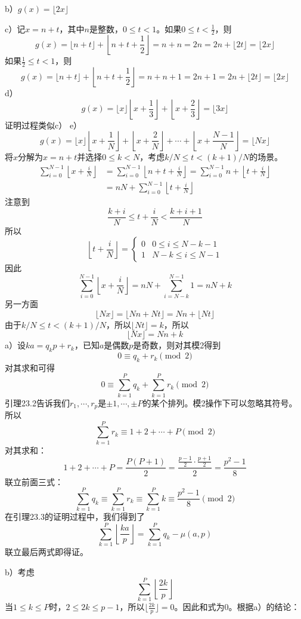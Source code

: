 b）$g(x)=\lfloor 2x\rfloor$\par
c）\proof 记$x=n+t$，其中$n$是整数，$0\le t<1$。如果$0\le t<\frac{1}{2}$，则
\[g(x)=\lfloor n+t\rfloor+\left\lfloor n+t+\frac{1}{2}\right\rfloor=n+n=2n=2n+\lfloor2t\rfloor=\lfloor 2x\rfloor\]
如果$\frac{1}{2}\le t<1$，则
\[g(x)=\lfloor n+t\rfloor+\left\lfloor n+t+\frac{1}{2}\right\rfloor=n+n+1=2n+1=2n+\lfloor2t\rfloor=\lfloor 2x\rfloor\]
d）
\[g(x)=\lfloor x\rfloor\left\lfloor x+\frac{1}{3}\right\rfloor+\left\lfloor x+\frac{2}{3}\right\rfloor=\lfloor3x\rfloor\]
证明过程类似c）
e）\[g(x)=\lfloor x\rfloor\left\lfloor x+\frac{1}{N}\right\rfloor+\left\lfloor x+\frac{2}{N}\right\rfloor+\cdots + \left\lfloor x+\frac{N-1}{N}\right\rfloor=\lfloor Nx\rfloor\]
\proof 将$x$分解为$x=n+t$并选择$0\le k<N$，考虑$k/N\le t<(k+1)/N$的场景。
\begin{align*}
\sum_{i=0}^{N-1}\left\lfloor x+\frac{i}{N}\right\rfloor&=\sum_{i=0}^{N-1}\left\lfloor n+t+\frac{i}{N}\right\rfloor=\sum_{i=0}^{N-1}n+\left\lfloor t+\frac{i}{N}\right\rfloor \\
&=nN + \sum_{i=0}^{N-1}\left\lfloor t+\frac{i}{N}\right\rfloor
\end{align*}
注意到
\[\frac{k+i}{N}\le t+\frac{i}{N}<\frac{k+i+1}{N}\]
所以
\[\left\lfloor t+\frac{i}{N}\right\rfloor=
\begin{cases}
0 & 0\le i \le N-k-1 \\
1 & N-k\le i \le N-1
\end{cases}\]
因此
\[\sum_{i=0}^{N-1}\left\lfloor x+\frac{i}{N}\right\rfloor=nN+\sum_{i=N-k}^{N-1}1=nN+k\]
另一方面
\[\lfloor Nx\rfloor=\lfloor Nn+Nt\rfloor=Nn+\lfloor Nt\rfloor\]
由于$k/N\le t<(k+1)/N$，所以$\lfloor Nt\rfloor=k$，所以
\[\lfloor Nx\rfloor=Nn+k\]
%
\exercise a）设$ka=q_kp+r_k$，已知$a$是偶数$p$是奇数，则对其模2得到
\[0\equiv q_k+r_k\pmod 2\]
对其求和可得
\[0\equiv\sum_{k=1}^P q_k+\sum_{k=1}^P r_k\pmod 2\]
引理23.2告诉我们$r_1,\cdots,r_p$是$\pm1,\cdots,\pm P$的某个排列。模2操作下可以忽略其符号。所以
\[\sum_{k=1}^P r_k\equiv 1+2+\cdots + P\pmod 2\]
对其求和：
\[1+2+\cdots + P=\frac{P(P+1)}{2}=\frac{\frac{p-1}{2}\cdot\frac{p+1}{2}}{2}=\frac{p^2-1}{8}\]
联立前面三式：
\[\sum_{k=1}^P q_k\equiv\sum_{k=1}^P r_k\equiv\sum_{k=1}^P k\equiv\frac{p^2-1}{8}\pmod2\]
在引理23.3的证明过程中，我们得到了
\[\sum_{k=1}^P\left\lfloor\frac{ka}{p}\right\rfloor=\sum_{k=1}^P q_k-\mu(a,p)\]
联立最后两式即得证。\par
b）考虑
\[\sum_{k=1}^P\left\lfloor\frac{2k}{p}\right\rfloor\]
当$1\le k\le P$时，$2\le 2k\le p-1$，所以$\lfloor\frac{2k}{p}\rfloor=0$。因此和式为0。根据a）的结论：
